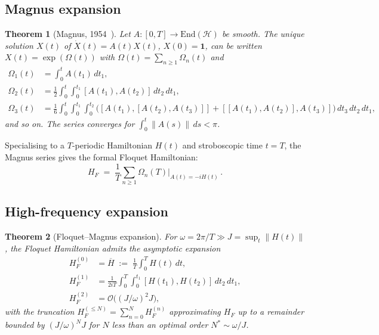 \documentclass[12pt]{article}
\newtheorem{theorem}{Theorem}[section]
\theoremstyle{definition}
\theoremstyle{remark}
\newcommand{\Hcal}{\mathcal{H}}
\newcommand{\one}{\mathbf{1}}
\newcommand{\HF}{H_{F}}
\begin{document}
\subsection{Magnus expansion}

\begin{theorem}[Magnus, 1954~\cite{magnus1954}]
\label{thm:magnus}
Let $A\colon[0,T]\to\mathrm{End}(\Hcal)$ be smooth. The unique solution $X(t)$ of $\dot X(t)=A(t)X(t)$, $X(0)=\one$, can be written $X(t)=\exp(\Omega(t))$ with $\Omega(t)=\sum_{n\geq 1}\Omega_n(t)$ and
\begin{align}
\Omega_1(t)&=\int_0^t A(t_1)\,dt_1,\\
\Omega_2(t)&=\frac{1}{2}\int_0^t\!\!\int_0^{t_1} [A(t_1),A(t_2)]\,dt_2\,dt_1,\\
\Omega_3(t)&=\frac{1}{6}\int_0^t\!\!\int_0^{t_1}\!\!\int_0^{t_2}\bigl([A(t_1),[A(t_2),A(t_3)]]+[[A(t_1),A(t_2)],A(t_3)]\bigr)\,dt_3\,dt_2\,dt_1,
\end{align}
and so on. The series converges for $\int_0^t\|A(s)\|\,ds < \pi$.
\end{theorem}

Specialising to a $T$-periodic Hamiltonian $H(t)$ and stroboscopic time $t=T$, the Magnus series gives the formal Floquet Hamiltonian:
\begin{equation}
\HF \;=\; \frac{1}{T}\sum_{n\geq 1}\Omega_n(T)\big|_{A(t)=-iH(t)}\,.
\end{equation}

\subsection{High-frequency expansion}

\begin{theorem}[Floquet--Magnus expansion]
\label{thm:fm-expansion}
For $\omega=2\pi/T\gg J=\sup_t\|H(t)\|$, the Floquet Hamiltonian admits the asymptotic expansion
\begin{align}
\HF^{(0)} &= \overline{H} \;:=\; \frac{1}{T}\int_0^T H(t)\,dt,\\
\HF^{(1)} &= \frac{1}{2iT}\int_0^T\!\int_0^{t_1}[H(t_1),H(t_2)]\,dt_2\,dt_1,\\
\HF^{(2)} &= \mathcal{O}\bigl((J/\omega)^2 J\bigr),
\end{align}
with the truncation $\HF^{(\leq N)}=\sum_{n=0}^N\HF^{(n)}$ approximating $\HF$ up to a remainder bounded by $(J/\omega)^N J$ for $N$ less than an optimal order $N^*\sim\omega/J$.
\end{theorem}
\end{document}
